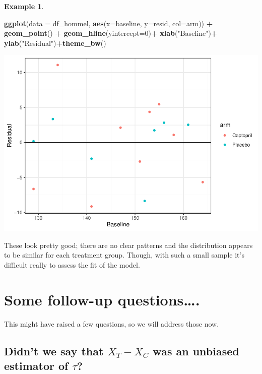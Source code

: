 \documentclass[
  openany]{book}
\newenvironment{Shaded}{\begin{snugshade}}{\end{snugshade}}
\newcommand{\AttributeTok}[1]{\textcolor[rgb]{0.13,0.29,0.53}{#1}}
\newcommand{\DecValTok}[1]{\textcolor[rgb]{0.00,0.00,0.81}{#1}}
\newcommand{\FunctionTok}[1]{\textcolor[rgb]{0.13,0.29,0.53}{\textbf{#1}}}
\newcommand{\NormalTok}[1]{#1}
\newcommand{\SpecialCharTok}[1]{\textcolor[rgb]{0.81,0.36,0.00}{\textbf{#1}}}
\newcommand{\StringTok}[1]{\textcolor[rgb]{0.31,0.60,0.02}{#1}}
\theoremstyle{definition}
\theoremstyle{definition}
\newtheorem{example}{Example}[chapter]
\theoremstyle{definition}
\theoremstyle{definition}
\theoremstyle{remark}
\begin{document}
\begin{example}
\begin{Shaded}
\begin{Highlighting}[]
\FunctionTok{ggplot}\NormalTok{(}\AttributeTok{data =}\NormalTok{ df\_hommel, }\FunctionTok{aes}\NormalTok{(}\AttributeTok{x=}\NormalTok{baseline, }\AttributeTok{y=}\NormalTok{resid, }\AttributeTok{col=}\NormalTok{arm)) }\SpecialCharTok{+} 
  \FunctionTok{geom\_point}\NormalTok{() }\SpecialCharTok{+}
  \FunctionTok{geom\_hline}\NormalTok{(}\AttributeTok{yintercept=}\DecValTok{0}\NormalTok{)}\SpecialCharTok{+}
  \FunctionTok{xlab}\NormalTok{(}\StringTok{"Baseline"}\NormalTok{)}\SpecialCharTok{+}
  \FunctionTok{ylab}\NormalTok{(}\StringTok{"Residual"}\NormalTok{)}\SpecialCharTok{+}\FunctionTok{theme\_bw}\NormalTok{()}
\end{Highlighting}
\end{Shaded}

\includegraphics{CT4H_notes_files/figure-latex/unnamed-chunk-16-1.pdf}

These look pretty good; there are no clear patterns and the distribution appears to be similar for each treatment group. Though, with such a small sample it's difficult really to assess the fit of the model.
\end{example}

\section{Some follow-up questions\ldots.}\label{some-follow-up-questions.}

This might have raised a few questions, so we will address those now.

\subsection{\texorpdfstring{Didn't we say that \(X_T - X_C\) was an unbiased estimator of \(\tau\)?}{Didn't we say that X\_T - X\_C was an unbiased estimator of \textbackslash tau?}}\label{didnt-we-say-that-x_t---x_c-was-an-unbiased-estimator-of-tau}
\end{document}
